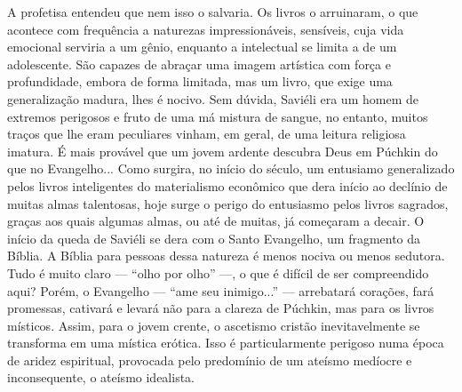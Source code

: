 A profetisa entendeu que nem isso o salvaria. Os livros o arruinaram, o
que acontece com frequência a naturezas impressionáveis, sensíveis, cuja
vida emocional serviria a um gênio, enquanto a intelectual se limita a
de um adolescente. São capazes de abraçar uma imagem artística com força
e profundidade, embora de forma limitada, mas um livro, que exige uma
generalização madura, lhes é nocivo. Sem dúvida, Saviéli era um homem de
extremos perigosos e fruto de uma má mistura de sangue, no entanto,
muitos traços que lhe eram peculiares vinham, em geral, de uma leitura
religiosa imatura. É mais provável que um jovem ardente descubra Deus em
Púchkin do que no Evangelho... Como surgira, no início do século, um
entusiamo generalizado pelos livros inteligentes do materialismo
econômico que dera início ao declínio de muitas almas talentosas, hoje
surge o perigo do entusiasmo pelos livros sagrados, graças aos quais
algumas almas, ou até de muitas, já começaram a decair. O início da
queda de Saviéli se dera com o Santo Evangelho, um fragmento da Bíblia.
A Bíblia para pessoas dessa natureza é menos nociva ou menos sedutora.
Tudo é muito claro --- ``olho por olho'' ---, o que é difícil de ser
compreendido aqui? Porém, o Evangelho --- ``ame seu inimigo...'' ---
arrebatará corações, fará promessas, cativará e levará não para a
clareza de Púchkin, mas para os livros místicos. Assim, para o jovem
crente, o ascetismo cristão inevitavelmente se transforma em uma mística
erótica. Isso é particularmente perigoso numa época de aridez
espiritual, provocada pelo predomínio de um ateísmo medíocre e
inconsequente, o ateísmo idealista.

